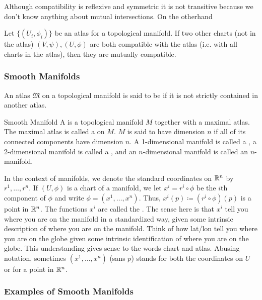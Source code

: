 Although compatibility is reflexive and symmetric it is not transitive because we don't know anything about mutual intersections.
%
On the otherhand
%
\begin{lemma}{}{}
    Let \(\{(U_i, \phi_i)\}\) be an atlas for a topological manifold. If two other charts (not in the atlas) \((V, \psi), (U, \phi)\) are both compatible with the atlas (i.e. with all charts in the atlas), then they are mutually compatible.
\end{lemma}

\subsubsection{Smooth Manifolds}

An atlas \(\mathfrak{M}\) on a topological manifold is said to be  if it is not strictly contained in another atlas.
\begin{definition}{Smooth Manifold}{}
    A  is a topological manifold \(M\) together with a maximal atlas.
    The maximal atlas is called a  on \(M\).
    \(M\) is said to have dimension \(n\) if all of its connected components have dimension \(n\).
    A 1-dimensional manifold is called a , a 2-dimensional manifold is called a , and an \(n\)-dimensional manifold is called an \(n\)-manifold.
\end{definition}

In the context of manifolds, we denote the standard coordinates on \(\mathbb{R}^n\) by \(r^1, \dots, r^n\).
%
If \((U, \phi)\) is a chart of a manifold, we let \(x^i = r^i \circ \phi\) be the \(i\)th component of \(\phi\) and write \(\phi = (x^1, \dots, x^n)\).
%
Thus, \(x^i(p) \coloneqq (r^i \circ \phi)(p)\) is a point in \(\mathbb{R}^n\).
%
The functions \(x^i\) are called the .
%
The sense here is that \(x^i\) tell you where you are on the manifold in a standardized way, given some intrinsic description of where you are on the manifold.
Think of how lat/lon tell you where you are on the globe given some intrinsic identification of where you are on the globe.
This understanding gives sense to the words chart and atlas.
%
Abusing notation, sometimes \((x^1, \dots, x^n)\) (sans \(p\)) stands for both the coordinates on \(U\) or for a point in \(\mathbb{R}^n\).

\subsubsection{Examples of Smooth Manifolds}

